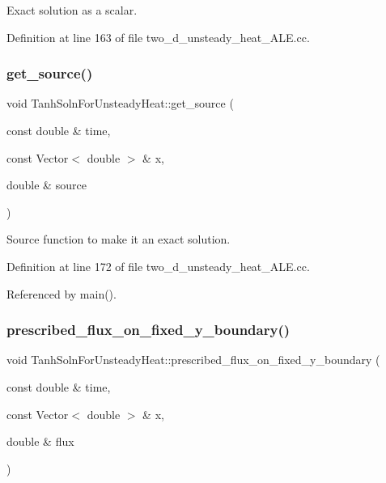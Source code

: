 Exact solution as a scalar. 



Definition at line 163 of file two\+\_\+d\+\_\+unsteady\+\_\+heat\+\_\+\+A\+L\+E.\+cc.

\mbox{\label{namespaceTanhSolnForUnsteadyHeat_aea922a29dfeeb80ef4768def0d6fbde4}} 
\subsubsection{\texorpdfstring{get\+\_\+source()}{get\_source()}}
{\footnotesize\ttfamily void Tanh\+Soln\+For\+Unsteady\+Heat\+::get\+\_\+source (\begin{DoxyParamCaption}\item[{const double \&}]{time,  }\item[{const Vector$<$ double $>$ \&}]{x,  }\item[{double \&}]{source }\end{DoxyParamCaption})}



Source function to make it an exact solution. 



Definition at line 172 of file two\+\_\+d\+\_\+unsteady\+\_\+heat\+\_\+\+A\+L\+E.\+cc.



Referenced by main().

\mbox{\label{namespaceTanhSolnForUnsteadyHeat_af4d78d73bd9981a5a9ecacecfd0e9cb8}} 
\subsubsection{\texorpdfstring{prescribed\+\_\+flux\+\_\+on\+\_\+fixed\+\_\+y\+\_\+boundary()}{prescribed\_flux\_on\_fixed\_y\_boundary()}}
{\footnotesize\ttfamily void Tanh\+Soln\+For\+Unsteady\+Heat\+::prescribed\+\_\+flux\+\_\+on\+\_\+fixed\+\_\+y\+\_\+boundary (\begin{DoxyParamCaption}\item[{const double \&}]{time,  }\item[{const Vector$<$ double $>$ \&}]{x,  }\item[{double \&}]{flux }\end{DoxyParamCaption})}



